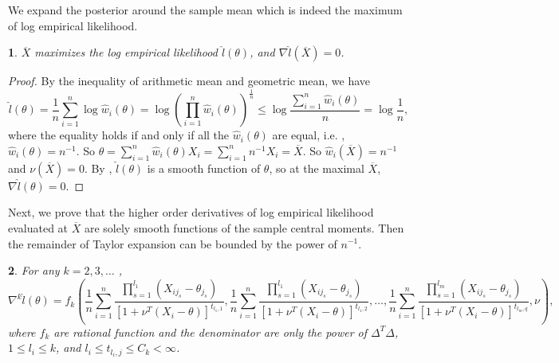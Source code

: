 \documentclass[oneside,english]{amsbook}
\numberwithin{section}{chapter}
\numberwithin{equation}{section}
\numberwithin{figure}{section}
\theoremstyle{plain}
\newtheorem{lem}{\protect\lemmaname}
\theoremstyle{plain}
\theoremstyle{definition}
\theoremstyle{plain}
\theoremstyle{plain}
\theoremstyle{remark}
\theoremstyle{definition}
\theoremstyle{definition}
\providecommand{\lemmaname}{Lemma}
\begin{document}
We expand the posterior around the sample mean which is indeed the
maximum of log empirical likelihood. 
\begin{lem}
\label{lem:mean-max-el}$\overline{X}$ maximizes the log empirical
likelihood $\hat{l}\left(\theta\right)$, and $\nabla\hat{l}\left(\overline{X}\right)=0$. \end{lem}
\begin{proof}
By the inequality of arithmetic mean and geometric mean, we have 
\begin{equation}
\hat{l}\left(\theta\right)=\frac{1}{n}\sum_{i=1}^{n}\log\hat{w}_{i}\left(\theta\right)=\log\left(\prod_{i=1}^{n}\hat{w}_{i}\left(\theta\right)\right)^{\frac{1}{n}}\le\log\frac{\sum_{i=1}^{n}\hat{w}_{i}\left(\theta\right)}{n}=\log\frac{1}{n},\label{eq:bound-log-el}
\end{equation}
where the equality holds if and only if all the $\hat{w}_{i}\left(\theta\right)$
are equal, i.e. , $\hat{w}_{i}\left(\theta\right)=n^{-1}.$ So $\theta=\sum_{i=1}^{n}\hat{w}_{i}\left(\theta\right)X_{i}=\sum_{i=1}^{n}n^{-1}X_{i}=\overline{X}$.
So $\hat{w}_{i}\left(\overline{X}\right)=n^{-1}$ and $\nu\left(\overline{X}\right)=0$.
By , $\hat{l}\left(\theta\right)$
is a smooth function of $\theta$, so at the maximal $\overline{X}$,
$\nabla\hat{l}\left(\theta\right)=0$. 
\end{proof}
Next, we prove that the higher order derivatives of log empirical
likelihood evaluated at $\overline{X}$ are solely smooth functions
of the sample central moments. Then the remainder of Taylor expansion
can be bounded by the power of $n^{-1}$. 
\begin{lem}
\label{lem:control-higher-order-derivative-l}For any $k=2,3,\ldots$
, 
\[
\nabla^{k}\hat{l}\left(\theta\right)=f_{k}\left(\frac{1}{n}\sum_{i=1}^{n}\frac{\prod_{s=1}^{l_{1}}\left(X_{ij_{s}}-\theta_{j_{s}}\right)}{\left[1+\nu^{T}\left(X_{i}-\theta\right)\right]^{t_{l_{1},1}}},\frac{1}{n}\sum_{i=1}^{n}\frac{\prod_{s=1}^{l_{1}}\left(X_{ij_{s}}-\theta_{j_{s}}\right)}{\left[1+\nu^{T}\left(X_{i}-\theta\right)\right]^{t_{l_{1},2}}},\ldots,\frac{1}{n}\sum_{i=1}^{n}\frac{\prod_{s=1}^{l_{m}}\left(X_{ij_{s}}-\theta_{j_{s}}\right)}{\left[1+\nu^{T}\left(X_{i}-\theta\right)\right]^{t_{l_{m},q}}},\nu\right),
\]
where $f_{k}$ are rational function and the denominator are only
the power of $\Delta^{T}\Delta$, $1\le l_{i}\le k$, and $l_{i}\le t_{l_{i},j}\le C_{k}<\infty$. \end{lem}
\end{document}
